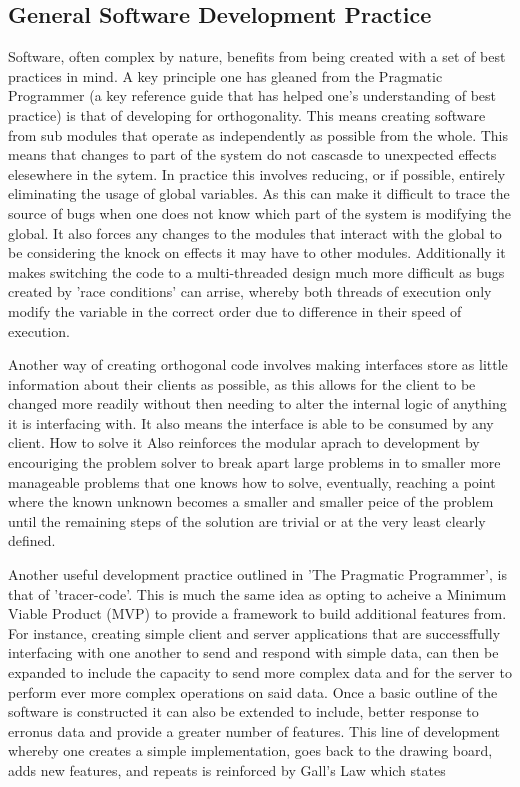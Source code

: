   \subsection{General Software Development Practice}
    Software, often complex by nature, benefits from being created with a set of best practices in mind. A key principle one has gleaned from the Pragmatic Programmer \citep{hunt2000pragmatic} (a key reference guide that has helped one's understanding of best practice) is that of developing for orthogonality. This means creating software from sub modules that operate as independently as possible from the whole. This means that changes to part of the system do not cascasde to unexpected effects elesewhere in the sytem. In practice this involves reducing, or if possible, entirely eliminating the usage of global variables. As this can make it difficult to trace the source of bugs when one does not know which part of the system is modifying the global. It also forces any changes to the modules that interact with the global to be considering the knock on effects it may have to other modules. Additionally it makes switching the code to a multi-threaded design much more difficult as bugs created by 'race conditions' can arrise, whereby both threads of execution only modify the variable in the correct order due to difference in their speed of execution.
    \par
    Another way of creating orthogonal code involves making interfaces store as little information about their clients as possible, as this allows for the client to be changed more readily without then needing to alter the internal logic of anything it is interfacing with. It also means the interface is able to be consumed by any client. How to solve it \citep{G.Polya1945} Also reinforces the modular aprach to development by encouriging the problem solver to break apart large problems in to smaller more manageable problems that one knows how to solve, eventually, reaching a point where the known unknown becomes a smaller and smaller peice of the problem until the remaining steps of the solution are trivial or at the very least clearly defined.
    \par
    Another useful development practice outlined in 'The Pragmatic Programmer', is that of 'tracer-code'. This is much the same idea as opting to acheive a Minimum Viable Product (MVP) to provide a framework to build additional features from. For instance, creating simple client and server applications that are successffully interfacing with one another to send and respond with simple data, can then be expanded to include the capacity to send more complex data and for the server to perform ever more complex operations on said data. Once a basic outline of the software is constructed it can also be extended to include, better response to erronus data and provide a greater number of features. This line of development whereby one creates a simple implementation, goes back to the drawing board, adds new features, and repeats is reinforced by Gall's Law which states  \citep{Gall1977}
